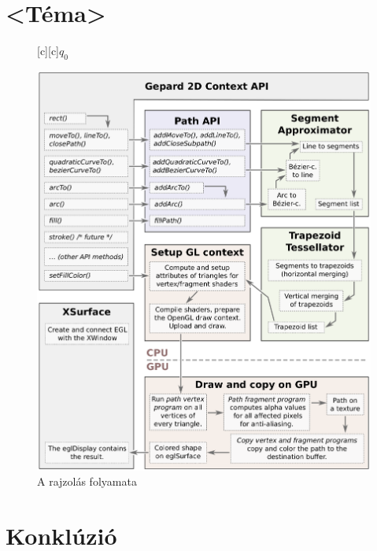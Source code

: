 \documentclass[12pt]{report}
\theoremstyle{definition}
\begin{document}

    \chapter{<Téma>\cite{Cabanier:14:HCC}}

    \begin{figure}[h]
    \centering
    [c][c]{$q_0$}
    \centerline{\includegraphics[scale=0.6]{eps/dataflow_svg}}
    \caption{\label{dataflow-diagram} A rajzolás folyamata}
    \end{figure}



    \chapter{Konklúzió}
\end{document}
